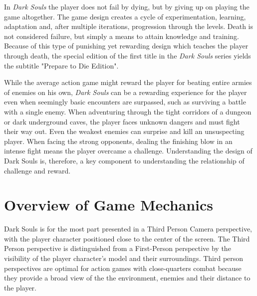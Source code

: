 In \emph{Dark Souls} the player does not fail by dying, but by giving up on playing the game altogether. The game design creates a cycle of experimentation, learning, adaptation and, after multiple iterations, progression through the levels. Death is not considered failure, but simply a means to attain knowledge and training. Because of this type of punishing yet rewarding design which teaches the player through death, the special edition of the first title in the \emph{Dark Souls} series yields the subtitle "Prepare to Die Edition".

While the average action game might reward the player for beating entire armies of enemies on his own, \emph{Dark Souls} can be a rewarding experience for the player even when seemingly basic encounters are surpassed, such as surviving a battle with a single enemy. When adventuring through the tight corridors of a dungeon or dark underground caves, the player faces unknown dangers and must fight their way out. Even the weakest enemies can surprise and kill an unsuspecting player. When facing the strong opponents, dealing the finishing blow in an intense fight means the player overcame a challenge. Understanding the design of Dark Souls is, therefore, a key component to understanding the relationship of challenge and reward.


\section{Overview of Game Mechanics}


Dark Souls is for the most part presented in a Third Person Camera perspective, with the player character positioned close to the center of the screen. The Third Person perspective is distinguished from a First-Person perspective by the visibility of the player character's model and their surroundings. Third person perspectives are optimal for action games with close-quarters combat because they provide a broad view of the the environment, enemies and their distance to the player.

